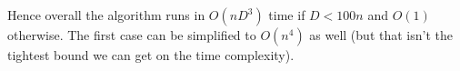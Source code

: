 \documentclass[answers]{exam}
\begin{document}
\begin{questions}
\begin{solution}
Hence overall the algorithm runs in $O(n D^3)$ time if $D < 100n$ and $O(1)$ otherwise. The first case can be simplified to $O(n^4)$ as well (but that isn't the tightest bound we can get on the time complexity).

    \end{solution}

\end{questions}
\end{document}
